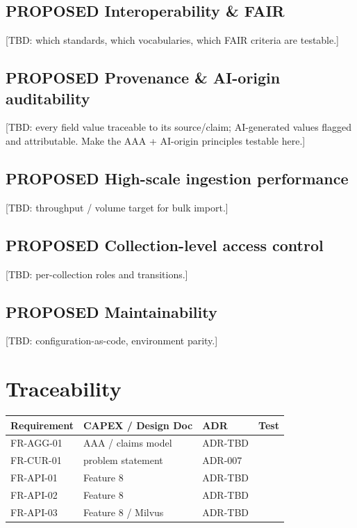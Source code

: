 \documentclass{scrartcl}
\begin{document}
\subsection{{\bfseries\sffamily PROPOSED} Interoperability \& FAIR}
\label{sec:orgb720353}
{[}TBD: which standards, which vocabularies, which FAIR criteria are testable.]
\subsection{{\bfseries\sffamily PROPOSED} Provenance \& AI-origin auditability}
\label{sec:orgc9f91ec}
{[}TBD: every field value traceable to its source/claim; AI-generated values flagged and attributable. Make the AAA + AI-origin principles testable here.]
\subsection{{\bfseries\sffamily PROPOSED} High-scale ingestion performance}
\label{sec:orgb2b9759}
{[}TBD: throughput / volume target for bulk import.]
\subsection{{\bfseries\sffamily PROPOSED} Collection-level access control}
\label{sec:orge207899}
{[}TBD: per-collection roles and transitions.]
\subsection{{\bfseries\sffamily PROPOSED} Maintainability}
\label{sec:orgcb0cdee}
{[}TBD: configuration-as-code, environment parity.]
\section{Traceability}
\label{sec:org13bff81}
\begin{center}
\begin{tabular}{llll}
Requirement & CAPEX / Design Doc & ADR & Test\\
\hline
FR-AGG-01 & AAA / claims model & ADR-TBD & \\
FR-CUR-01 & problem statement & ADR-007 & \\
FR-API-01 & Feature 8 & ADR-TBD & \\
FR-API-02 & Feature 8 & ADR-TBD & \\
FR-API-03 & Feature 8 / Milvus & ADR-TBD & \\
\end{tabular}
\end{center}
\end{document}
